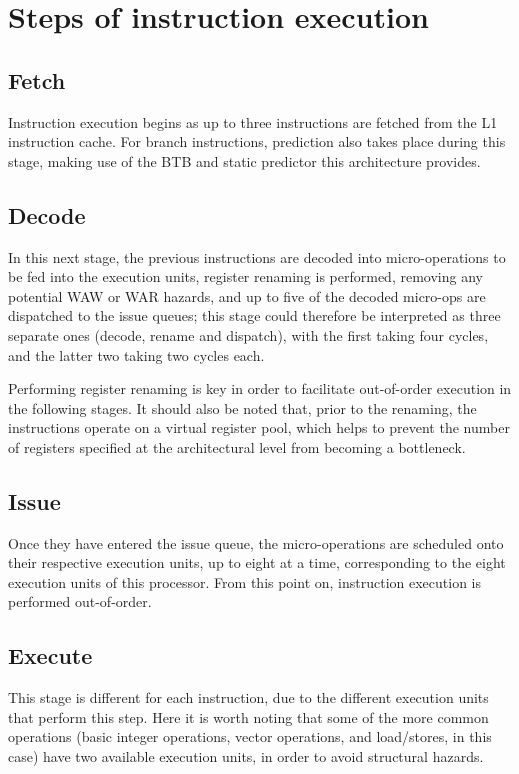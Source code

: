 \section{Steps of instruction execution}
\subsection*{Fetch}
\hspace{\parindent}Instruction execution begins as up to three instructions are fetched from the L1 instruction cache. For branch instructions, prediction also takes place during this stage, making use of the BTB and static predictor this architecture provides.
\subsection*{Decode}
\hspace{\parindent}In this next stage, the previous instructions are decoded into micro-operations to be fed into the execution units, register renaming is performed, removing any potential WAW or WAR hazards, and up to five of the decoded micro-ops are dispatched to the issue queues; this stage could therefore be interpreted as three separate ones (decode, rename and dispatch), with the first taking four cycles, and the latter two taking two cycles each.\par
Performing register renaming is key in order to facilitate out-of-order execution in the following stages. It should also be noted that, prior to the renaming, the instructions operate on a virtual register pool, which helps to prevent the number of registers specified at the architectural level from becoming a bottleneck. \cite{renaming}
\subsection*{Issue}
\hspace{\parindent}Once they have entered the issue queue, the micro-operations are scheduled onto their respective execution units, up to eight at a time, corresponding to the eight execution units of this processor. From this point on, instruction execution is performed out-of-order.
\subsection*{Execute}
\hspace{\parindent}This stage is different for each instruction, due to the different execution units that perform this step. Here it is worth noting that some of the more common operations (basic integer operations, vector operations, and load/stores, in this case) have two available execution units, in order to avoid structural hazards.
